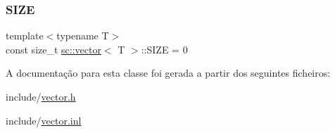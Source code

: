 \subsubsection{\texorpdfstring{S\+I\+ZE}{SIZE}}
{\footnotesize\ttfamily template$<$typename T$>$ \\
const size\+\_\+t \mbox{\hyperlink{classsc_1_1vector}{sc\+::vector}}$<$ T $>$\+::S\+I\+ZE = 0\hspace{0.3cm}{\ttfamily [static]}}



A documentação para esta classe foi gerada a partir dos seguintes ficheiros\+:\begin{DoxyCompactItemize}
\item 
include/\mbox{\hyperlink{vector_8h}{vector.\+h}}\item 
include/\mbox{\hyperlink{vector_8inl}{vector.\+inl}}\end{DoxyCompactItemize}
